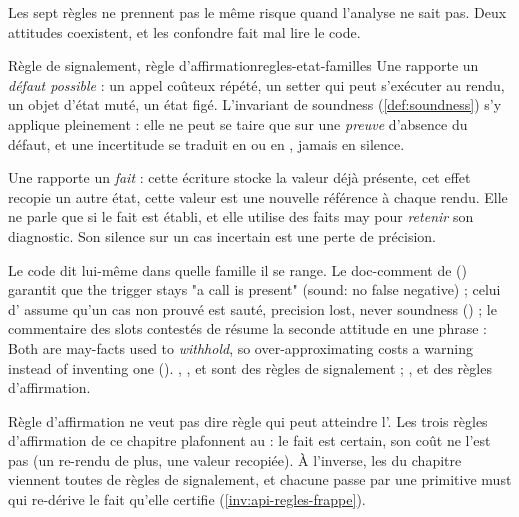 Les sept règles ne prennent pas le même risque quand l'analyse ne sait pas. Deux attitudes coexistent, et les confondre fait mal lire le code.

\begin{definition}{Règle de signalement, règle d'affirmation}{regles-etat-familles}
Une  rapporte un \emph{défaut possible} : un appel coûteux répété, un setter qui peut s'exécuter au rendu, un objet d'état muté, un état figé. L'invariant de soundness (\cref{def:soundness}) s'y applique pleinement : elle ne peut se taire que sur une \emph{preuve} d'absence du défaut, et une incertitude se traduit en \Warning{} ou en \Info, jamais en silence.

Une  rapporte un \emph{fait} : \og cette écriture stocke la valeur déjà présente\fg{}, \og cet effet recopie un autre état\fg{}, \og cette valeur est une nouvelle référence à chaque rendu\fg. Elle ne parle que si le fait est établi, et elle utilise des faits may pour \emph{retenir} son diagnostic. Son silence sur un cas incertain est une perte de précision.
\end{definition}

Le code dit lui-même dans quelle famille il se range. Le doc-comment de  () garantit que \og the trigger stays "a call is present" (sound: no false negative)\fg{} ; celui d' assume qu'un cas non prouvé est sauté, \og precision lost, never soundness\fg{} () ; le commentaire des slots contestés de  résume la seconde attitude en une phrase : \og Both are may-facts used to \emph{withhold}, so over-approximating costs a warning instead of inventing one\fg{} (). , ,  et  sont des règles de signalement ; ,  et  des règles d'affirmation.

\begin{piege}
\og Règle d'affirmation\fg{} ne veut pas dire \og règle qui peut atteindre l'\Error\fg. Les trois règles d'affirmation de ce chapitre plafonnent au \Warning{} : le fait est certain, son coût ne l'est pas (un re-rendu de plus, une valeur recopiée). À l'inverse, les \Error{} du chapitre viennent toutes de règles de signalement, et chacune passe par une primitive must qui re-dérive le fait qu'elle certifie (\cref{inv:api-regles-frappe}).
\end{piege}

